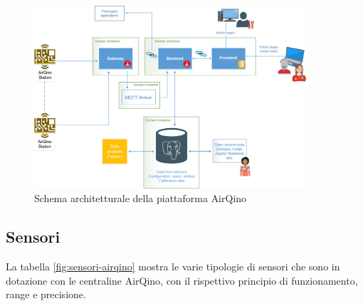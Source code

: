 \begin{figure}[H]
\centering
\captionsetup{justification=centering}
\includegraphics[width=0.90\textwidth,height=\textheight,keepaspectratio]{img/airqino_arch}
\caption{Schema architetturale della piattaforma AirQino}
\label{fig:airqino}
\end{figure}

\subsection{Sensori}\label{ssec:hardware}
La tabella \ref{fig:sensori-airqino} mostra le varie tipologie di sensori che sono in dotazione con le centraline AirQino, con il rispettivo principio di funzionamento, range e precisione.

